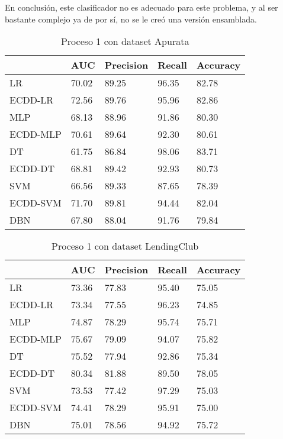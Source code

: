 En conclusión, este clasificador no es adecuado para este problema, y al ser bastante complejo ya de por sí, no se le creó una versión ensamblada.


\begin{table}[]
\centering
\caption{Proceso 1 con dataset Apurata}
\label{tab:apurata-proc1}
\begin{tabularx}{0.75\textwidth}{|l|Y Y Y Y|}
                \hline
                & AUC       & Precision & Recall    & Accuracy  \\
                \hline
LR              & 70.02     & 89.25     & 96.35     & 82.78     \\
ECDD-LR           & 72.56     & 89.76     & 95.96     & 82.86     \\
                \hline
MLP             & 68.13     & 88.96     & 91.86     & 80.30     \\
ECDD-MLP          & 70.61     & 89.64     & 92.30     & 80.61     \\
                \hline
DT              & 61.75     & 86.84     & 98.06     & 83.71     \\
ECDD-DT           & 68.81     & 89.42     & 92.93     & 80.73     \\
                \hline
SVM             & 66.56     & 89.33     & 87.65     & 78.39     \\
ECDD-SVM          & 71.70     & 89.81     & 94.44     & 82.04     \\
                \hline
DBN             & 67.80     & 88.04     & 91.76     & 79.84     \\
                \hline
\end{tabularx}
\end{table}


\begin{table}[]
\centering
\caption{Proceso 1 con dataset LendingClub}
\label{tab:lc-proc1}
\begin{tabularx}{0.75\textwidth}{|l|Y Y Y Y|}
                \hline
                & AUC       & Precision & Recall    & Accuracy  \\
                \hline
LR              & 73.36     & 77.83     & 95.40     & 75.05		\\
ECDD-LR           & 73.34     & 77.55     & 96.23     & 74.85		\\
                \hline
MLP             & 74.87     & 78.29     & 95.74     & 75.71		\\
ECDD-MLP          & 75.67     & 79.09     & 94.07     & 75.82		\\
                \hline
DT              & 75.52     & 77.94     & 92.86     & 75.34		\\
ECDD-DT           & 80.34     & 81.88     & 89.50     & 78.05		\\
                \hline
SVM             & 73.53     & 77.42     & 97.29     & 75.03		\\
ECDD-SVM          & 74.41     & 78.29     & 95.91     & 75.00		\\
                \hline
DBN             & 75.01     & 78.56     & 94.92     & 75.72		\\
                \hline
\end{tabularx}
\end{table}


